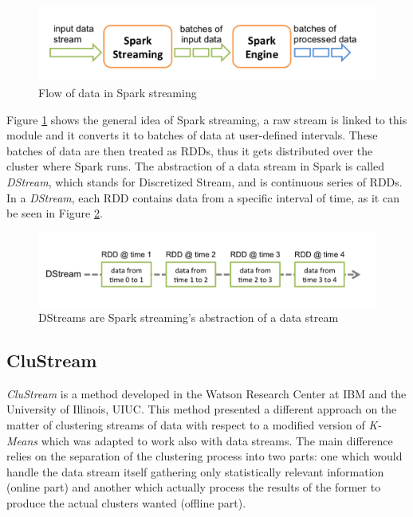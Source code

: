 \documentclass[10pt, conference, compsocconf]{IEEEtran}
\begin{document}
\begin{figure}[h!]
 \centering
 \includegraphics[scale=0.45]{./styles/streaming-flow.png}
 \caption{Flow of data in Spark streaming}
 \label{fig:streamFlow}
\end{figure}

Figure \ref{fig:streamFlow} shows the general idea of Spark streaming\cite{sparkStreaming}, a raw stream is linked to this module and it converts it to batches of data at user-defined intervals. These batches of data are then treated as RDDs, thus it gets distributed over the cluster where Spark runs. The abstraction of a data stream in Spark is called \textit{DStream}, which stands for Discretized Stream, and is continuous series of RDDs. In a \textit{DStream}, each RDD contains data from a specific interval of time, as it can be seen in Figure \ref{fig:dstream}.


\begin{figure}[h!]
 \centering
 \includegraphics[scale=0.45]{./styles/streaming-dstream.png}
 \caption{DStreams are Spark streaming's abstraction of a data stream}
 \label{fig:dstream}
\end{figure}

\subsection{CluStream}

\textit{CluStream} is a method developed in the Watson Research Center at IBM and the University of Illinois, UIUC. This method presented a different approach on the matter of clustering streams of data with respect to a modified version of \textit{K-Means} which was adapted to work also with data streams. The main difference relies on the separation of the clustering process into two parts: one which would handle the data stream itself gathering only statistically relevant information (online part) and another which actually process the results of the former to produce the actual clusters wanted (offline part). 
\end{document}

